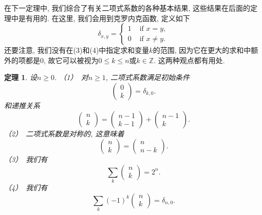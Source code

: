 \documentclass{ctexbook}
\newtheorem{thm}{定理}[section]
\begin{document}
在下一定理中, 我们综合了有关二项式系数的各种基本结果, 这些结果在后面的定理中是有用的. 在这里, 我们会用到克罗内克函数, 定义如下
$$
\delta_{x, y}=\left\{\begin{array}{ll}
1 & \text { if } x=y, \\
0 & \text { if } x \neq y.
\end{array}\right.
$$
还要注意, 我们没有在(3)和(4)中指定求和变量$k$的范围, 因为它在更大的求和中额外的项都是0,
故它可以被视为$0 \leqslant k \leqslant n$或$k \in \mathbb{Z}$. 这两种观点都有用处.
    \begin{thm}
    	设$n \geqslant 0$.
    		（1）\ 对$n \geqslant 1$, 二项式系数满足初始条件
    		$$
    		\left(\begin{array}{l}
    		0 \\ k
    		\end{array}\right)=\delta_{k, 0}.
    		$$
    		和递推关系
    		$$
    		\left(\begin{array}{l}
    		n \\ k
    		\end{array}\right)=\left(\begin{array}{c}
    		n-1 \\ k-1
    		\end{array}\right)+\left(\begin{array}{c}
    		n-1 \\ k
    		\end{array}\right).
    		$$
    		（2）\ 二项式系数是对称的, 这意味着
    		$$
    		\left(\begin{array}{l}
    		n \\ k
    		\end{array}\right)=\left(\begin{array}{c}
    		n \\ n-k
    		\end{array}\right).
    		$$
    		（3）\ 我们有
    		$$
    		\sum_{k}\left(\begin{array}{l}
    		n \\ k
    		\end{array}\right)=2^{n}.
    		$$
    		（4）\ 我们有
    		$$
    		\sum_{k}(-1)^{k}\left(\begin{array}{l}
    		n \\ k
    		\end{array}\right)=\delta_{n, 0}.
    		$$
    \end{thm}
\end{document}
